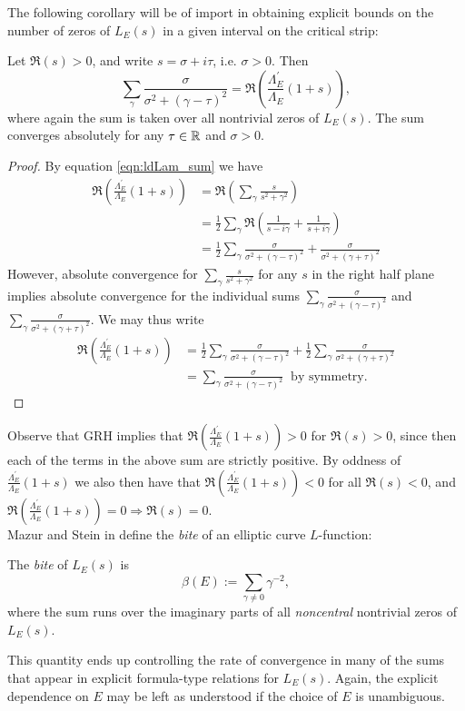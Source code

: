 \documentclass[10pt]{article}
\newcommand{\pr}{^{\prime}}
\newcommand{\Les}{L_E(s)}
\newcommand{\ldLam}[1]{\frac{\Lambda_E\pr}{\Lambda_E}\left(#1\right)}
\begin{document}
The following corollary will be of import in obtaining explicit bounds on the number of zeros of $L_E(s)$ in a given interval on the critical strip:
\begin{corollary}\label{cor:Re_logderiv}
Let $\Re(s) > 0$, and write $s = \sigma + i\tau$, i.e. $\sigma > 0$. Then
\begin{equation}
\sum_{\gamma} \frac{\sigma}{\sigma^2+(\gamma-\tau)^2} = \Re\left(\ldLam{1+s}\right),
\end{equation}
where again the sum is taken over all nontrivial zeros of $L_E(s)$. The sum converges absolutely for any $\tau \in \mathbb{R}$ and $\sigma > 0$.
\end{corollary}
\begin{proof}
By equation \ref{eqn:ldLam_sum} we have
\begin{align*}
\Re\left(\ldLam{1+s}\right) &= \Re\left(\sum_{\gamma} \frac{s}{s^2+\gamma^2}\right) \\
& = \frac{1}{2} \sum_{\gamma} \Re\left(\frac{1}{s - i \gamma} + \frac{1}{s + i \gamma}\right) \\
&= \frac{1}{2} \sum_{\gamma} \frac{\sigma}{\sigma^2+(\gamma-\tau)^2} +  \frac{\sigma}{\sigma^2+(\gamma+\tau)^2}
\end{align*}
However, absolute convergence for $\sum_{\gamma} \frac{s}{s^2+\gamma^2}$ for any $s$ in the right half plane implies absolute convergence for the individual sums $\sum_{\gamma} \frac{\sigma}{\sigma^2+(\gamma-\tau)^2}$ and $\sum_{\gamma} \frac{\sigma}{\sigma^2+(\gamma+\tau)^2}$. We may thus write
\begin{align*}
\Re\left(\ldLam{1+s}\right) &= \frac{1}{2} \sum_{\gamma} \frac{\sigma}{\sigma^2+(\gamma-\tau)^2} +  \frac{1}{2} \sum_{\gamma}\frac{\sigma}{\sigma^2+(\gamma+\tau)^2} \\
&= \sum_{\gamma} \frac{\sigma}{\sigma^2+(\gamma-\tau)^2} \;\;\text{by symmetry.}
\end{align*}
\end{proof}
Observe that GRH implies that $\Re(\ldLam{1+s})>0$ for $\Re(s)>0$, since then each of the terms in the above sum are strictly positive. By oddness of $\ldLam{1+s}$ we also then have that $\Re(\ldLam{1+s})<0$ for all $\Re(s)<0$, and $\Re(\ldLam{1+s})=0 \Rightarrow \Re(s)=0$. \\

Mazur and Stein in \cite{MaSt-2013} define the {\it bite} of an elliptic curve $L$-function:
\begin{definition}
The {\it bite} of $\Les$ is
\begin{equation}
\beta(E) := \sum_{\gamma \ne 0} \gamma^{-2},
\end{equation}
where the sum runs over the imaginary parts of all {\it noncentral} nontrivial zeros of $\Les$.
\end{definition}
This quantity ends up controlling the rate of convergence in many of the sums that appear in explicit formula-type relations for $\Les$. Again, the explicit dependence on $E$ may be left as understood if the choice of $E$ is unambiguous.
\end{document}

